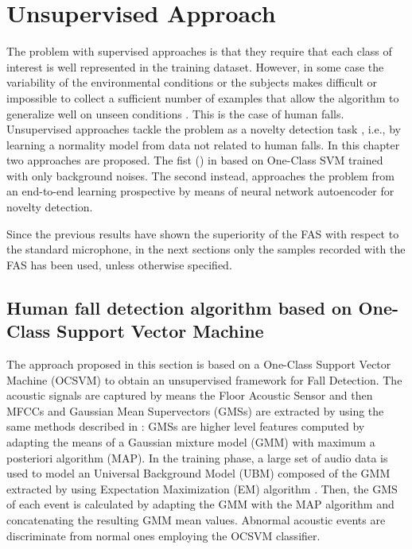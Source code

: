 \chapter{Unsupervised Approach}
\label{ch:unsupervised_approaches}

The problem with supervised approaches is that they require that each class of interest is well represented in the training dataset. However, in some case the variability of the environmental conditions or the subjects makes difficult or impossible to collect a sufficient number of examples that allow the algorithm to generalize well on unseen conditions \cite{Noury2007}. This is the case of human falls. Unsupervised approaches tackle the problem as a novelty detection task \cite{markou2003novelty1,markou2003novelty2}, i.e., by learning a normality model from data not related to human falls. In this chapter two approaches are proposed. The fist () in based on One-Class SVM  trained with only background noises. The second  instead, approaches the problem from an end-to-end learning prospective by means of neural network autoencoder  for novelty detection.

Since the previous results have shown the superiority of the FAS with respect to the standard microphone, in the next sections only the samples recorded with the FAS has been used, unless otherwise specified.

\section{Human fall detection algorithm based on One-Class Support Vector Machine}
\label{sec:ocsvm_approach}

The approach proposed in this section is based on a One-Class Support Vector Machine (OCSVM) \cite{scholkopf2000} to obtain an unsupervised framework for Fall Detection.
The acoustic signals are captured by means the Floor Acoustic Sensor and then MFCCs and Gaussian Mean Supervectors (GMSs) are extracted by using the same methods described in : GMSs are higher level features computed by adapting the means of a Gaussian mixture model (GMM) with maximum a posteriori algorithm (MAP).
In the training phase, a large set of audio data is used to model an Universal Background Model (UBM) composed of the GMM extracted by using Expectation Maximization (EM) algorithm \cite{bilmes1998gentle}.
Then, the GMS of each event is calculated by adapting the GMM with the MAP algorithm and concatenating the resulting GMM mean values.
Abnormal acoustic events are discriminate from normal ones employing the OCSVM classifier.


